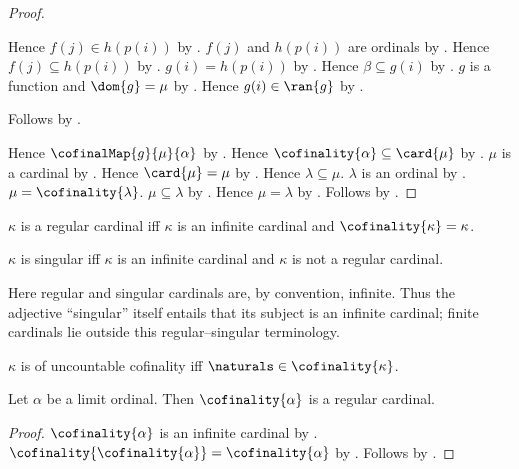 \begin{proof}
\begin{subproof}
\begin{subproof}
            Hence $f(j)\in h(p(i))$
                by .
            $f(j)$ and $h(p(i))$ are ordinals
                by .
            Hence $f(j)\subseteq h(p(i))$
                by .
            $g(i)=h(p(i))$ by .
            Hence $\beta\subseteq g(i)$
                by .
            $g$ is a function and $\dom{g}=\mu$
                by .
            Hence $g(i)\in\ran{g}$ by .
        \end{subproof}
        Follows by .
    \end{subproof}
    Hence $\cofinalMap{g}{\mu}{\alpha}$ by .
    Hence $\cofinality{\alpha}\subseteq\card{\mu}$
        by .
    $\mu$ is a cardinal by .
    Hence $\card{\mu}=\mu$ by .
    Hence $\lambda\subseteq\mu$.
    $\lambda$ is an ordinal by .
    $\mu=\cofinality{\lambda}$.
    $\mu\subseteq\lambda$ by .
    Hence $\mu=\lambda$ by .
    Follows by \auto.
\end{proof}

\begin{definition}\label{regular_cardinal}
    $\kappa$ is a regular cardinal iff $\kappa$ is an infinite cardinal and
        $\cofinality{\kappa}=\kappa$.
\end{definition}

\begin{definition}\label{singular_cardinal}
    $\kappa$ is singular iff $\kappa$ is an infinite cardinal and
        $\kappa$ is not a regular cardinal.
\end{definition}

Here regular and singular cardinals are, by convention, infinite.  Thus the
adjective ``singular'' itself entails that its subject is an infinite cardinal;
finite cardinals lie outside this regular--singular terminology.

\begin{abbreviation}\label{uncountable_cofinality}
    $\kappa$ is of uncountable cofinality iff
        $\naturals\in\cofinality{\kappa}$.
\end{abbreviation}

\begin{theorem}\label{cofinality_of_limit_is_regular}
    Let $\alpha$ be a limit ordinal.
    Then $\cofinality{\alpha}$ is a regular cardinal.
\end{theorem}
\begin{proof}
    $\cofinality{\alpha}$ is an infinite cardinal
        by .
    $\cofinality{\cofinality{\alpha}}=\cofinality{\alpha}$
        by .
    Follows by .
\end{proof}
